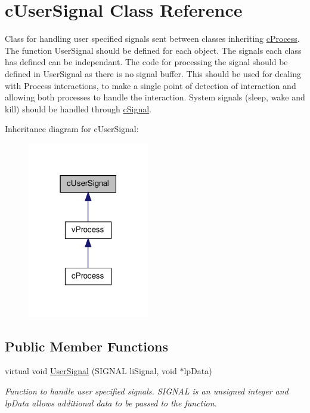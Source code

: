 \hypertarget{classc_user_signal}{
\section{cUserSignal Class Reference}
\label{classc_user_signal}
}


Class for handling user specified signals sent between classes inheriting \hyperlink{classc_process}{cProcess}. The function UserSignal should be defined for each object. The signals each class has defined can be independant. The code for processing the signal should be defined in UserSignal as there is no signal buffer. This should be used for dealing with Process interactions, to make a single point of detection of interaction and allowing both processes to handle the interaction. System signals (sleep, wake and kill) should be handled through \hyperlink{classc_signal}{cSignal}.  




Inheritance diagram for cUserSignal:
\nopagebreak
\begin{figure}[H]
\begin{center}
\leavevmode
\includegraphics[width=150pt]{classc_user_signal__inherit__graph}
\end{center}
\end{figure}
\subsection*{Public Member Functions}
\begin{DoxyCompactItemize}
\item 
virtual void \hyperlink{classc_user_signal_ab11af50af566f1df2a8cf41902e1ac9f}{UserSignal} (SIGNAL liSignal, void $\ast$lpData)
\begin{DoxyCompactList}\small\item\em Function to handle user specified signals. SIGNAL is an unsigned integer and lpData allows additional data to be passed to the function. \item\end{DoxyCompactList}\end{DoxyCompactItemize}


